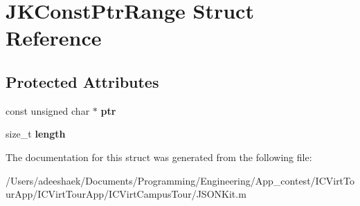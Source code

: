 \hypertarget{struct_j_k_const_ptr_range}{\section{J\-K\-Const\-Ptr\-Range Struct Reference}
\label{struct_j_k_const_ptr_range}
}
\subsection*{Protected Attributes}
\begin{DoxyCompactItemize}
\item 
\hypertarget{struct_j_k_const_ptr_range_ab5e1439ef74d96af956fc88a466b2270}{const unsigned char $\ast$ {\bfseries ptr}}\label{struct_j_k_const_ptr_range_ab5e1439ef74d96af956fc88a466b2270}

\item 
\hypertarget{struct_j_k_const_ptr_range_ae809d5359ac030c60a30a8f0b2294b82}{size\-\_\-t {\bfseries length}}\label{struct_j_k_const_ptr_range_ae809d5359ac030c60a30a8f0b2294b82}

\end{DoxyCompactItemize}


The documentation for this struct was generated from the following file\-:\begin{DoxyCompactItemize}
\item 
/\-Users/adeeshaek/\-Documents/\-Programming/\-Engineering/\-App\-\_\-contest/\-I\-C\-Virt\-Tour\-App/\-I\-C\-Virt\-Tour\-App/\-I\-C\-Virt\-Campus\-Tour/J\-S\-O\-N\-Kit.\-m\end{DoxyCompactItemize}
